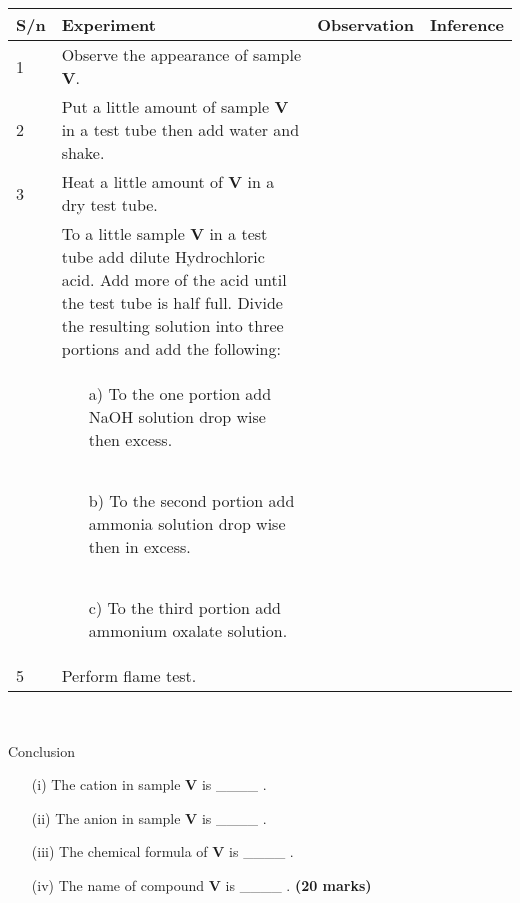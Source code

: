 \begin{center}
\begin{tabular}{|l|p{8cm}|l|l|}
\hline
\textbf{S/n}&\textbf{Experiment}&\textbf{Observation}&\textbf{Inference}\\ \hline
1&Observe the appearance of sample \textbf{V}.&&\\ \hline
2&Put a little amount of sample \textbf{V} in a test tube then add water and shake.&&\\ \hline
3&Heat a little amount of \textbf{V} in a dry test tube.&&\\ \hline
{\multirow{4}{*}{4}}&To a little sample \textbf{V} in a test tube add dilute Hydrochloric acid. Add more of the acid until the test tube is half full. Divide the resulting solution into three portions and add the following:&&\\ \cline{2-4}
&\begin{enumerate}
\item[a)] To the one portion add NaOH solution drop wise then excess.
\end{enumerate}&&\\ \cline{2-4}
&\begin{enumerate}
\item[b)] To the second portion add ammonia solution drop wise then in excess.
\end{enumerate}&&\\ \cline{2-4}
&\begin{enumerate}
\item[c)] To the third portion add ammonium oxalate solution.
\end{enumerate}&&\\ \hline
5&Perform flame test.&&\\ \hline
\end{tabular}\\

\end{center}
\newpage
Conclusion\\
\begin{enumerate}
\item[(i)] The cation in sample \textbf{V} is \_\_\_\_ .
\item[(ii)] The anion in sample \textbf{V} is \_\_\_\_ .
\item[(iii)] The chemical formula of \textbf{V} is \_\_\_\_ .
\item[(iv)] The name of compound \textbf{V} is \_\_\_\_ . \hfill \textbf{(20 marks)} \\
\end{enumerate}

